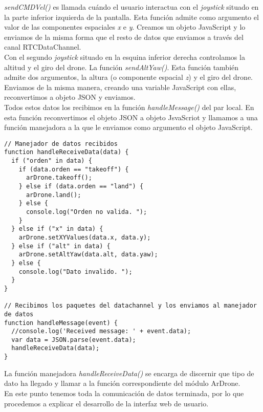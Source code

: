 \emph{sendCMDVel()} es llamada cuándo el usuario interactua con el \emph{joystick} situado en la parte inferior izquierda de la pantalla. Esta función admite como argumento el valor de las componentes espaciales \emph{x} e \emph{y}. Creamos un objeto JavaScript y lo enviamos de la misma forma que el resto de datos que enviamos a través del canal RTCDataChannel.\\

Con el segundo \emph{joystick} situado en la esquina inferior derecha controlamos la altitud y el giro del drone. La función \emph{sendAltYaw()}. Esta función también admite dos argumentos, la altura (o componente espacial \emph{z}) y el giro del drone. Enviamos de la misma manera, creando una variable JavaScript con ellas, reconvertimos a objeto JSON y enviamos.\\

Todos estos datos los recibimos en la función \emph{handleMessage()} del par local. En esta función reconvertimos el objeto JSON a objeto JsvaScriot y llamamos a una función manejadora a la que le enviamos como argumento el objeto JavaScript.\\

\begin{lstlisting}[caption=Manejo de las órdenes recibidas en el par local.]
// Manejador de datos recibidos 
function handleReceiveData(data) {
  if ("orden" in data) {
    if (data.orden == "takeoff") {
      arDrone.takeoff();
    } else if (data.orden == "land") {
      arDrone.land();
    } else {
      console.log("Orden no valida. ");
    }
  } else if ("x" in data) {
    arDrone.setXYValues(data.x, data.y);
  } else if ("alt" in data) {
    arDrone.setAltYaw(data.alt, data.yaw);
  } else {
    console.log("Dato invalido. ");
  }		
}

// Recibimos los paquetes del datachannel y los enviamos al manejador de datos
function handleMessage(event) {
  //console.log('Received message: ' + event.data);
  var data = JSON.parse(event.data);
  handleReceiveData(data);
}
\end{lstlisting}


La función manejadora \emph{handleReceiveData()} se encarga de discernir que tipo de dato ha llegado y llamar a la función correspondiente del módulo ArDrone.\\

En este punto tenemos toda la comunicación de datos terminada, por lo que procedemos a explicar el desarrollo de la interfaz web de usuario.\\

